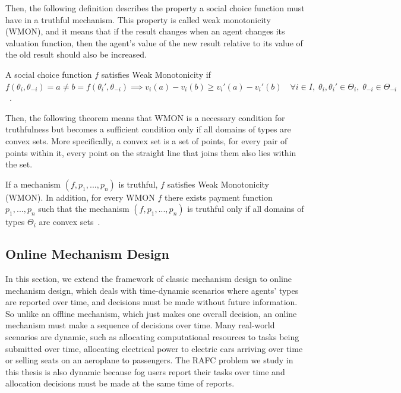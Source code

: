 \documentclass[11pt]{phdthesis}
\begin{document}
Then, the following definition describes the property a social choice function must have in a truthful mechanism. This property is called weak monotonicity (WMON), and it means that if the result changes when an agent changes its valuation function, then the agent's value of the new result relative to its value of the old result should also be increased.
\begin{definition}
    A social choice function $f$ satisfies Weak Monotonicity if $ f(\theta_i, \theta_{-i}) = a \neq b = f(\theta_i', \theta_{-i}) \implies v_i(a) - v_i(b) \geq v_i'(a) - v_i'(b) \quad \forall i \in I, \;  \theta_i,\theta_{i}' \in \Theta_i, \; \theta_{-i} \in \Theta_{-i} $~\citep[Definition 9.28]{nisan2007algorithmic}.
\end{definition}

Then, the following theorem means that WMON is a necessary condition for truthfulness but becomes a sufficient condition only if all domains of types are convex sets. More specifically, a convex set is a set of points, for every pair of points within it, every point on the straight line that joins them also lies within the set.

\begin{theorem}
    If a mechanism $(f,p_1,...,p_n)$ is truthful, $f$ satisfies Weak Monotonicity (WMON). In addition, for every WMON $f$ there exists payment function $p_1,...,p_n$ such that the mechanism $(f,p_1,...,p_n)$ is truthful only if all domains of types $\Theta_i$ are convex sets~\citep[Theorem 9.29]{nisan2007algorithmic}.
\end{theorem}


\subsection{Online Mechanism Design} \label{online mechanism design}

In this section, we extend the framework of classic mechanism design to online mechanism design, which deals with time-dynamic scenarios where agents' types are reported over time, and decisions must be made without future information. So unlike an offline mechanism, which just makes one overall decision, an online mechanism must make a sequence of decisions over time. 
Many real-world scenarios are dynamic, such as allocating computational resources to tasks being submitted over time, allocating electrical power to electric cars arriving over time or selling seats on an aeroplane to passengers. 
The RAFC problem we study in this thesis is also dynamic because fog users report their tasks over time and allocation decisions must be made at the same time of reports.
\end{document}
